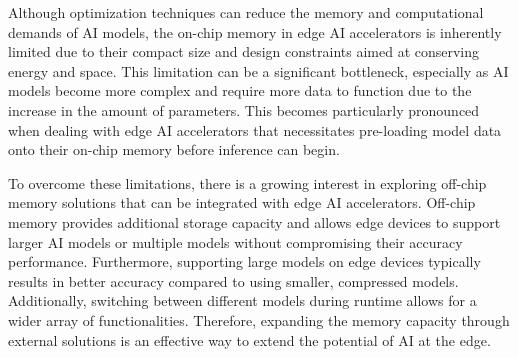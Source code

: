 Although optimization techniques can reduce the memory and computational demands of AI models, the on-chip memory in edge AI accelerators is inherently limited due to their compact size and design constraints aimed at conserving energy and space.
This limitation can be a significant bottleneck, especially as AI models become more complex and require more data to function due to the increase in the amount of parameters.
This becomes particularly pronounced when dealing with edge AI accelerators that necessitates pre-loading model data onto their on-chip memory before inference can begin.

To overcome these limitations, there is a growing interest in exploring off-chip memory solutions that can be integrated with edge AI accelerators.
Off-chip memory provides additional storage capacity and allows edge devices to support larger AI models or multiple models without compromising their accuracy performance.
Furthermore, supporting large models on edge devices typically results in better accuracy compared to using smaller, compressed models.
Additionally, switching between different models during runtime allows for a wider array of functionalities.
Therefore, expanding the memory capacity through external solutions is an effective way to extend the potential of AI at the edge.


